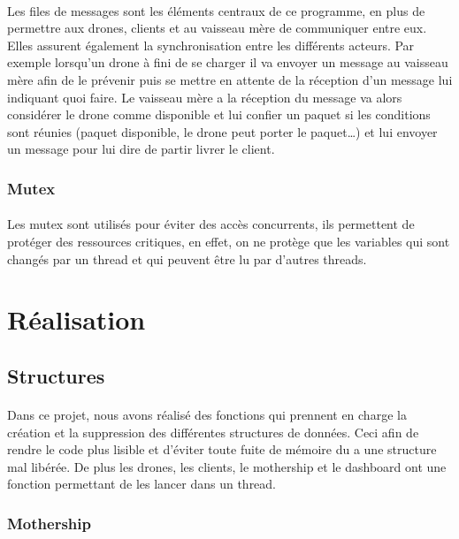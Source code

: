 \documentclass[article, backcover, french, nodocumentinfo]{upmethodology-document}
\begin{document}
				\paragraph*{}
					Les files de messages sont les éléments centraux de ce programme, en plus de permettre aux drones, clients et au vaisseau mère de communiquer entre eux. Elles assurent également la synchronisation entre les différents acteurs. Par exemple lorsqu'un drone à fini de se charger il va envoyer un message au vaisseau mère afin de le prévenir puis se mettre en attente de la réception d'un message lui indiquant quoi faire. Le vaisseau mère a la réception du message va alors considérer le drone comme disponible et lui confier un paquet si les conditions sont réunies (paquet disponible, le drone peut porter le paquet\ldots) et lui envoyer un message pour lui dire de partir livrer le client.
			\subsubsection{Mutex}
				\paragraph*{}
					Les mutex sont utilisés pour éviter des accès concurrents, ils permettent de protéger des ressources critiques, en effet, on ne protège que les variables qui sont changés par un thread et qui peuvent être lu par d'autres threads.
	\section{Réalisation}
		\subsection{Structures}
			\paragraph*{}
				Dans ce projet, nous avons réalisé des fonctions qui prennent en charge la création et la suppression des différentes structures de données. Ceci afin de rendre le code plus lisible et d'éviter toute fuite de mémoire du a une structure mal libérée. De plus les drones, les clients, le mothership et le dashboard ont une fonction permettant de les lancer dans un thread.
			\subsubsection{Mothership}
\end{document}
